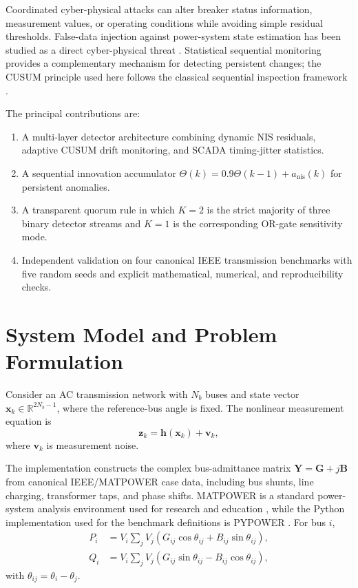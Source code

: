 \documentclass[journal]{IEEEtran}
\begin{document}
Coordinated cyber-physical attacks can alter breaker status information, measurement values, or operating conditions while avoiding simple residual thresholds. False-data injection against power-system state estimation has been studied as a direct cyber-physical threat \cite{Liu2011}. Statistical sequential monitoring provides a complementary mechanism for detecting persistent changes; the CUSUM principle used here follows the classical sequential inspection framework \cite{Page1954}.

The principal contributions are:
\begin{enumerate}
    \item A multi-layer detector architecture combining dynamic NIS residuals, adaptive CUSUM drift monitoring, and SCADA timing-jitter statistics.
    \item A sequential innovation accumulator $\Theta(k)=0.9\Theta(k-1)+a_{\mathrm{nis}}(k)$ for persistent anomalies.
    \item A transparent quorum rule in which $K=2$ is the strict majority of three binary detector streams and $K=1$ is the corresponding OR-gate sensitivity mode.
    \item Independent validation on four canonical IEEE transmission benchmarks with five random seeds and explicit mathematical, numerical, and reproducibility checks.
\end{enumerate}

\section{System Model and Problem Formulation}
Consider an AC transmission network with $N_b$ buses and state vector $\mathbf{x}_k\in\mathbb{R}^{2N_b-1}$, where the reference-bus angle is fixed. The nonlinear measurement equation is
\begin{equation}
\mathbf{z}_k=\mathbf{h}(\mathbf{x}_k)+\mathbf{v}_k,
\end{equation}
where $\mathbf{v}_k$ is measurement noise.

The implementation constructs the complex bus-admittance matrix $\mathbf{Y}=\mathbf{G}+j\mathbf{B}$ from canonical IEEE/MATPOWER case data, including bus shunts, line charging, transformer taps, and phase shifts. MATPOWER is a standard power-system analysis environment used for research and education \cite{Zimmerman2011}, while the Python implementation used for the benchmark definitions is PYPOWER \cite{PYPOWER}. For bus $i$,
\begin{align}
P_i &= V_i\sum_j V_j\left(G_{ij}\cos\theta_{ij}+B_{ij}\sin\theta_{ij}\right),\\
Q_i &= V_i\sum_j V_j\left(G_{ij}\sin\theta_{ij}-B_{ij}\cos\theta_{ij}\right),
\end{align}
with $\theta_{ij}=\theta_i-\theta_j$.
\end{document}
